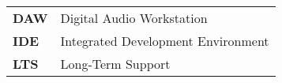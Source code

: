 
\renewcommand{\arraystretch}{1.5}



\begin{longtable}{l p{13.7cm}}
	
\textbf{DAW} & Digital Audio Workstation \\
\textbf{IDE} & Integrated Development Environment \\
\textbf{LTS} & Long-Term Support \\

\end{longtable}
